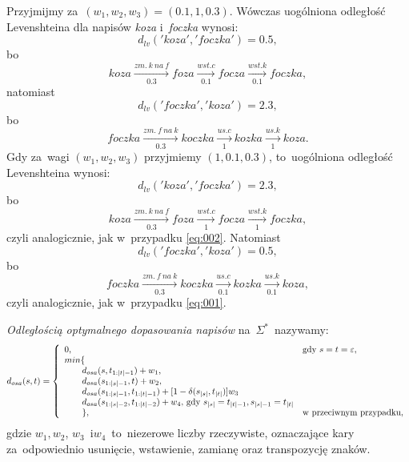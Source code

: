 \documentclass{praca1}
\begin{document}
\begin{example}
Przyjmijmy za~$(w_1, w_2, w_3) = (0.1, 1, 0.3)$. Wówczas uogólniona odległość Levenshteina dla napisów \emph{koza} i~\emph{foczka} wynosi:
\begin{equation}
\label{eq:001}
d_{lv}('koza', 'foczka') = 0.5,
\end{equation}
bo
$$
koza  \xrightarrow[0.3]{zm.\ k\ na\ f} foza  \xrightarrow[0.1]{wst. c} focza \xrightarrow[0.1]{wst. k} foczka,
$$
natomiast
\begin{equation}\label{eq:002}
d_{lv}('foczka', 'koza') = 2.3,
\end{equation}
bo
$$
foczka  \xrightarrow[0.3]{zm.\ f\ na\ k} koczka  \xrightarrow[1]{us. c} kozka \xrightarrow[1]{us. k} koza.
$$
Gdy za~wagi $(w_1, w_2, w_3)$ przyjmiemy $(1, 0.1, 0.3)$, to~uogólniona odległość Levenshteina wynosi:
$$
d_{lv}('koza', 'foczka') = 2.3,
$$
bo
$$
koza  \xrightarrow[0.3]{zm.\ k\ na\ f} foza  \xrightarrow[1]{wst. c} focza \xrightarrow[1]{wst. k} foczka,
$$
czyli analogicznie, jak w~przypadku \ref{eq:002}. Natomiast
$$
d_{lv}('foczka', 'koza') = 0.5,
$$
bo
$$
foczka  \xrightarrow[0.3]{zm.\ f\ na\ k} koczka  \xrightarrow[0.1]{us. c} kozka \xrightarrow[0.1]{us. k} koza,
$$
czyli analogicznie, jak w~przypadku \ref{eq:001}.
\end{example}


\begin{definition}
\emph{Odległością optymalnego dopasowania napisów} na~$\Sigma^*$~nazywamy:
$$
d_{osa}(s, t) = \left\{
\begin{array}{l l}     
    0, & \text{gdy } s = t = \varepsilon,\\
    min\{ & \\
\qquad    d_{osa}(s, t_{1:|t|-1}) + w_1, & \\
\qquad    d_{osa}(s_{1:|s|-1}, t) + w_2, & \\
\qquad    d_{osa}(s_{1:|s|-1}, t_{1:|t|-1}) + [1-\delta(s_{|s|}, t_{|t|})]w_3 & \\
\qquad    d_{osa}(s_{1:|s|-2}, t_{1:|t|-2}) + w_4\text{, gdy } s_{|s|} = t_{|t|-1}, s_{|s|-1} = t_{|t|} & \\
\qquad    \}, & \text{w przeciwnym przypadku},
\end{array}\right.
$$
gdzie $w_1, w_2$, $w_3$~i$w_4$~to~niezerowe liczby rzeczywiste, oznaczające kary za~odpowiednio usunięcie, wstawienie, zamianę oraz transpozycję znaków.
\end{definition}
\end{document}
